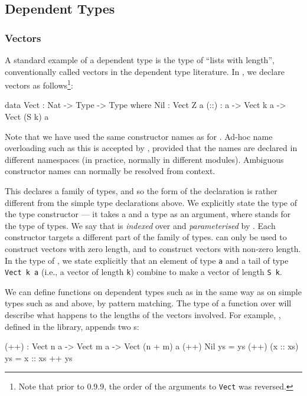 \subsection{Dependent Types}

\subsubsection{Vectors}

A standard example of a dependent type is the type of ``lists with length'', conventionally called vectors in the dependent type literature.
In \Idris{}, we declare vectors as follows\footnote{Note that prior to \Idris{} 0.9.9, the order of the arguments to \texttt{Vect} was reversed.}:

\begin{code}
data Vect : Nat -> Type -> Type where
   Nil  : Vect Z a
   (::) : a -> Vect k a -> Vect (S k) a
\end{code}

\noindent
Note that we have used the same constructor names as for .
Ad-hoc name overloading such as this is accepted by \Idris{}, provided that the names are declared in different namespaces (in practice, normally in different modules).
Ambiguous constructor names can normally be resolved from context.

This declares a family of types, and so the form of the declaration is rather different from the simple type declarations above.
We explicitly state the type of the type constructor  --- it takes a  and a type as an
argument, where  stands for the type of types.
We say that  is \emph{indexed} over  and \emph{parameterised} by .
Each constructor targets a different part of the family of types.  can only be used to construct vectors with zero length, and \tDC{::} to construct vectors with non-zero length.
In the type of \tDC{::}, we state explicitly that an element of type \texttt{a} and a tail of type \texttt{Vect k a} (i.e., a vector of length \texttt{k}) combine to make a vector of length \texttt{S k}.

We can define functions on dependent types such as  in the same way as on simple types such as  and  above, by pattern matching.
The type of a function over  will describe what happens to the lengths of the vectors involved.
For example, \tFN{++}, defined in the library, appends two s:

\begin{code}
(++) : Vect n a -> Vect m a -> Vect (n + m) a
(++) Nil       ys = ys
(++) (x :: xs) ys = x :: xs ++ ys
\end{code}


